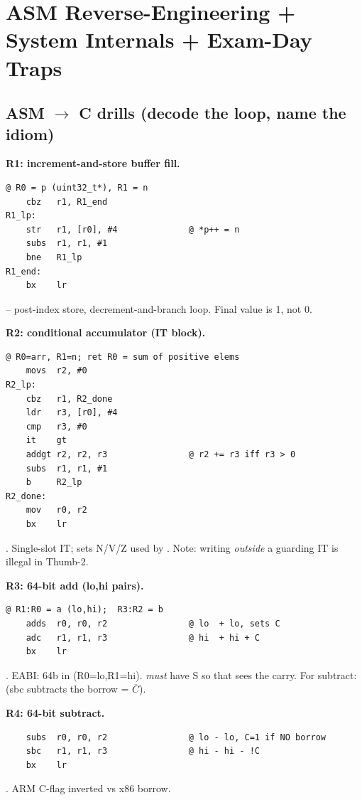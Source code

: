 \section{ASM Reverse-Engineering + System Internals + Exam-Day Traps}

\subsection{ASM $\to$ C drills (decode the loop, name the idiom)}

\textbf{R1: increment-and-store buffer fill.}
\begin{lstlisting}
@ R0 = p (uint32_t*), R1 = n
    cbz   r1, R1_end
R1_lp:
    str   r1, [r0], #4              @ *p++ = n
    subs  r1, r1, #1
    bne   R1_lp
R1_end:
    bx    lr
\end{lstlisting}
 -- post-index store, decrement-and-branch loop. Final  value is 1, not 0.

\textbf{R2: conditional accumulator (IT block).}
\begin{lstlisting}
@ R0=arr, R1=n; ret R0 = sum of positive elems
    movs  r2, #0
R2_lp:
    cbz   r1, R2_done
    ldr   r3, [r0], #4
    cmp   r3, #0
    it    gt
    addgt r2, r2, r3                @ r2 += r3 iff r3 > 0
    subs  r1, r1, #1
    b     R2_lp
R2_done:
    mov   r0, r2
    bx    lr
\end{lstlisting}
. Single-slot IT;  sets N/V/Z used by . Note: writing  \emph{outside} a guarding IT is illegal in Thumb-2.

\textbf{R3: 64-bit add (lo,hi pairs).}
\begin{lstlisting}
@ R1:R0 = a (lo,hi);  R3:R2 = b
    adds  r0, r0, r2                @ lo  + lo, sets C
    adc   r1, r1, r3                @ hi  + hi + C
    bx    lr
\end{lstlisting}
. EABI: 64b in (R0=lo,R1=hi).  \emph{must} have S so that  sees the carry. For subtract:  (sbc subtracts the borrow = $\overline{C}$).

\textbf{R4: 64-bit subtract.}
\begin{lstlisting}
    subs  r0, r0, r2                @ lo - lo, C=1 if NO borrow
    sbc   r1, r1, r3                @ hi - hi - !C
    bx    lr
\end{lstlisting}
. ARM C-flag inverted vs x86 borrow.


